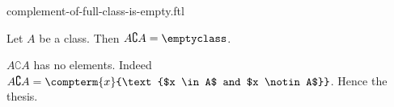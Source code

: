 \documentclass{article}
\begin{document}
\begin{smodule}[creators={Marcel Schütz}]{complement-of-full-class-is-empty.ftl}

  \begin{fproposition*}[label=7846433484963840]
    Let $A$ be a class.
    Then $A \complement A = \emptyclass$.
  \end{fproposition*}
  \begin{fproof}
    $A \complement A$ has no elements.
    Indeed $A \complement A = \compterm{x}{\text{$x \in A$ and $x \notin A$}}$.
    Hence the thesis.
  \end{fproof}
\end{smodule}
\end{document}
